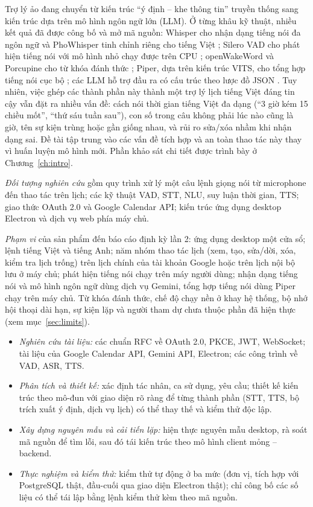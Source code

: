 Trợ lý ảo đang chuyển từ kiến trúc “ý định – khe thông tin” truyền thống sang kiến trúc dựa trên mô hình ngôn ngữ lớn (LLM). Ở từng khâu kỹ thuật, nhiều kết quả đã được công bố và mở mã nguồn: Whisper cho nhận dạng tiếng nói đa ngôn ngữ \cite{radford2022whisper} và PhoWhisper tinh chỉnh riêng cho tiếng Việt \cite{phowhisper}; Silero VAD cho phát hiện tiếng nói với mô hình nhỏ chạy được trên CPU \cite{silero}; openWakeWord và Porcupine cho từ khóa đánh thức \cite{openwakeword,porcupine}; Piper, dựa trên kiến trúc VITS, cho tổng hợp tiếng nói cục bộ \cite{vits,piper}; các LLM hỗ trợ đầu ra có cấu trúc theo lược đồ JSON \cite{geministructured}. Tuy nhiên, việc ghép các thành phần này thành một trợ lý lịch tiếng Việt đáng tin cậy vẫn đặt ra nhiều vấn đề: cách nói thời gian tiếng Việt đa dạng (“3 giờ kém 15 chiều mốt”, “thứ sáu tuần sau”), con số trong câu không phải lúc nào cũng là giờ, tên sự kiện trùng hoặc gần giống nhau, và rủi ro sửa/xóa nhầm khi nhận dạng sai. Đề tài tập trung vào các vấn đề tích hợp và an toàn thao tác này thay vì huấn luyện mô hình mới. Phần khảo sát chi tiết được trình bày ở Chương~\ref{ch:intro}.

\textit{Đối tượng nghiên cứu} gồm quy trình xử lý một câu lệnh giọng nói từ microphone đến thao tác trên lịch; các kỹ thuật VAD, STT, NLU, suy luận thời gian, TTS; giao thức OAuth 2.0 và Google Calendar API; kiến trúc ứng dụng desktop Electron và dịch vụ web phía máy chủ.

\textit{Phạm vi} của sản phẩm đến báo cáo định kỳ lần 2: ứng dụng desktop một cửa sổ; lệnh tiếng Việt và tiếng Anh; năm nhóm thao tác lịch (xem, tạo, sửa/dời, xóa, kiểm tra lịch trống) trên lịch chính của tài khoản Google hoặc trên lịch nội bộ lưu ở máy chủ; phát hiện tiếng nói chạy trên máy người dùng; nhận dạng tiếng nói và mô hình ngôn ngữ dùng dịch vụ Gemini, tổng hợp tiếng nói dùng Piper chạy trên máy chủ. Từ khóa đánh thức, chế độ chạy nền ở khay hệ thống, bộ nhớ hội thoại dài hạn, sự kiện lặp và người tham dự chưa thuộc phần đã hiện thực (xem mục~\ref{sec:limits}).

\begin{itemize}
  \item \textit{Nghiên cứu tài liệu:} các chuẩn RFC về OAuth 2.0, PKCE, JWT, WebSocket; tài liệu của Google Calendar API, Gemini API, Electron; các công trình về VAD, ASR, TTS.
  \item \textit{Phân tích và thiết kế:} xác định tác nhân, ca sử dụng, yêu cầu; thiết kế kiến trúc theo mô-đun với giao diện rõ ràng để từng thành phần (STT, TTS, bộ trích xuất ý định, dịch vụ lịch) có thể thay thế và kiểm thử độc lập.
  \item \textit{Xây dựng nguyên mẫu và cải tiến lặp:} hiện thực nguyên mẫu desktop, rà soát mã nguồn để tìm lỗi, sau đó tái kiến trúc theo mô hình client mỏng – backend.
  \item \textit{Thực nghiệm và kiểm thử:} kiểm thử tự động ở ba mức (đơn vị, tích hợp với PostgreSQL thật, đầu-cuối qua giao diện Electron thật); chỉ công bố các số liệu có thể tái lập bằng lệnh kiểm thử kèm theo mã nguồn.
\end{itemize}

